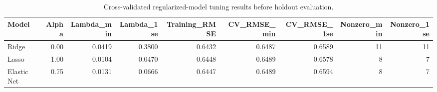 \begin{table}

\caption{\label{tab:p4-regularized-summary}Cross-validated regularized-model tuning results before holdout evaluation.}
\centering
\begin{tabular}[t]{lrrrrrrrr}
\toprule
Model & Alpha & Lambda\_min & Lambda\_1se & Training\_RMSE & CV\_RMSE\_min & CV\_RMSE\_1se & Nonzero\_min & Nonzero\_1se\\
\midrule
Ridge & 0.00 & 0.0419 & 0.3800 & 0.6432 & 0.6487 & 0.6589 & 11 & 11\\
Lasso & 1.00 & 0.0104 & 0.0470 & 0.6448 & 0.6489 & 0.6578 & 8 & 7\\
Elastic Net & 0.75 & 0.0131 & 0.0666 & 0.6447 & 0.6489 & 0.6594 & 8 & 7\\
\bottomrule
\end{tabular}
\end{table}

